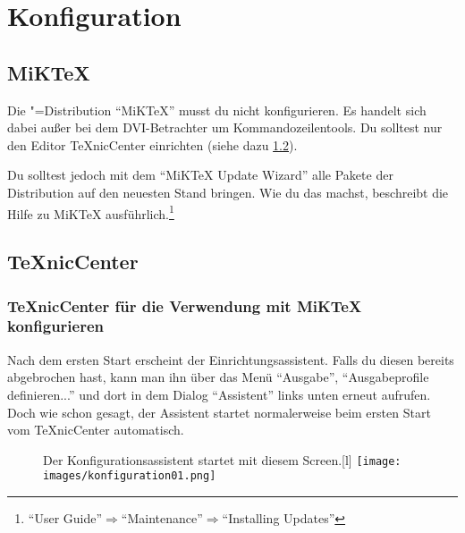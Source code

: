 %
%

\chapter{Konfiguration}

\section{MiKTeX}

Die \DMLLaTeX"=Distribution \enquote{MiKTeX} musst du nicht konfigurieren. Es handelt sich dabei außer bei dem DVI-Betrachter um Kommandozeilentools. Du solltest nur den Editor TeXnicCenter einrichten (siehe dazu \ref{sec:KonfigurationTeXnicCenter}).

Du solltest jedoch mit dem \enquote{MiKTeX Update Wizard} alle Pakete der Distribution auf den neuesten Stand bringen. Wie du das machst, beschreibt die Hilfe zu MiKTeX ausführlich.\footnote{\enquote{User Guide}$\Rightarrow$\enquote{Maintenance}$\Rightarrow$\enquote{Installing Updates}}

\section{TeXnicCenter}
\label{sec:KonfigurationTeXnicCenter}

\subsection{TeXnicCenter für die Verwendung mit MiKTeX konfigurieren}

Nach dem ersten Start erscheint der Einrichtungsassistent. Falls du diesen bereits abgebrochen hast, kann man ihn über das Menü \enquote{Ausgabe}, \enquote{Ausgabeprofile definieren...} und dort in dem Dialog \enquote{Assistent} links unten erneut aufrufen. Doch wie schon gesagt, der Assistent startet normalerweise beim ersten Start vom TeXnicCenter automatisch.

\begin{figure}[hb]
	\begin{captionbeside}{Der Konfigurationsassistent  startet mit diesem Screen.}[l]
		\texttt{[image: images/konfiguration01.png]}
	\end{captionbeside}
	\label{fig:konfiguration01}
\end{figure}

